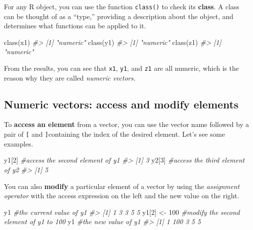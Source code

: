 \documentclass[
]{book}
\newenvironment{Shaded}{\begin{snugshade}}{\end{snugshade}}
\newcommand{\CommentTok}[1]{\textcolor[rgb]{0.56,0.35,0.01}{\textit{#1}}}
\newcommand{\DecValTok}[1]{\textcolor[rgb]{0.00,0.00,0.81}{#1}}
\newcommand{\FunctionTok}[1]{\textcolor[rgb]{0.00,0.00,0.00}{#1}}
\newcommand{\NormalTok}[1]{#1}
\newcommand{\OtherTok}[1]{\textcolor[rgb]{0.56,0.35,0.01}{#1}}
\begin{document}
For any R object, you can use the function \texttt{class()} to check its \textbf{class}. A class can be thought of as a ``type,'' providing a description about the object, and determines what functions can be applied to it.

\begin{Shaded}
\begin{Highlighting}[]
\FunctionTok{class}\NormalTok{(x1)}
\CommentTok{\#\textgreater{} [1] "numeric"}
\FunctionTok{class}\NormalTok{(y1)}
\CommentTok{\#\textgreater{} [1] "numeric"}
\FunctionTok{class}\NormalTok{(z1)}
\CommentTok{\#\textgreater{} [1] "numeric"}
\end{Highlighting}
\end{Shaded}

From the results, you can see that \texttt{x1}, \texttt{y1}, and \texttt{z1} are all numeric, which is the reason why they are called \emph{numeric vectors}.

\hypertarget{numeric-vectors-access-and-modify-elements-1}{%
\subsection{Numeric vectors: access and modify elements}\label{numeric-vectors-access-and-modify-elements-1}}

To \textbf{access an element} from a vector, you can use the vector name followed by a pair of \texttt{{[}} and \texttt{{]}}containing the index of the desired element. Let's see some examples.

\begin{Shaded}
\begin{Highlighting}[]
\NormalTok{y1[}\DecValTok{2}\NormalTok{]     }\CommentTok{\#access the second element of y1}
\CommentTok{\#\textgreater{} [1] 3}
\NormalTok{y2[}\DecValTok{3}\NormalTok{]     }\CommentTok{\#access the third element of y2}
\CommentTok{\#\textgreater{} [1] 5}
\end{Highlighting}
\end{Shaded}

You can also \textbf{modify} a particular element of a vector by using the \emph{assignment operator} with the access expression on the left and the new value on the right.

\begin{Shaded}
\begin{Highlighting}[]
\NormalTok{y1               }\CommentTok{\#the current value of y1}
\CommentTok{\#\textgreater{} [1] 1 3 3 5 5}
\NormalTok{y1[}\DecValTok{2}\NormalTok{] }\OtherTok{\textless{}{-}} \DecValTok{100}     \CommentTok{\#modify the second element of y1 to 100}
\NormalTok{y1               }\CommentTok{\#the new value of y1}
\CommentTok{\#\textgreater{} [1]   1 100   3   5   5}
\end{Highlighting}
\end{Shaded}
\end{document}
